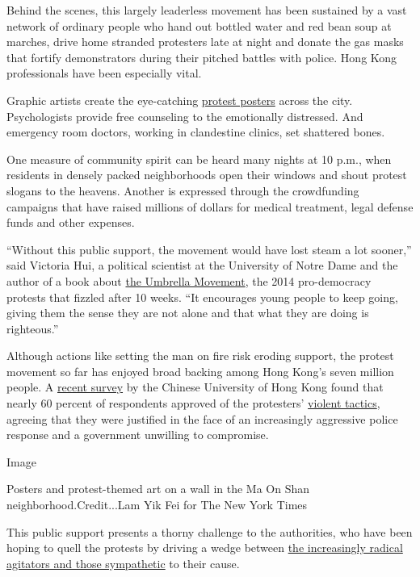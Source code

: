 Behind the scenes, this largely leaderless movement has been sustained
by a vast network of ordinary people who hand out bottled water and red
bean soup at marches, drive home stranded protesters late at night and
donate the gas masks that fortify demonstrators during their pitched
battles with police. Hong Kong professionals have been especially vital.

Graphic artists create the eye-catching
\href{https://www.nytimes.com/2019/10/11/world/asia/hong-kong-protest-art.html}{protest
posters} across the city. Psychologists provide free counseling to the
emotionally distressed. And emergency room doctors, working in
clandestine clinics, set shattered bones.

One measure of community spirit can be heard many nights at 10 p.m.,
when residents in densely packed neighborhoods open their windows and
shout protest slogans to the heavens. Another is expressed through the
crowdfunding campaigns that have raised millions of dollars for medical
treatment, legal defense funds and other expenses.

``Without this public support, the movement would have lost steam a lot
sooner,'' said Victoria Hui, a political scientist at the University of
Notre Dame and the author of a book about
\href{https://www.nytimes.com/2019/04/23/world/asia/hong-kong-umbrella-movement.html}{the
Umbrella Movement}, the 2014 pro-democracy protests that fizzled after
10 weeks. ``It encourages young people to keep going, giving them the
sense they are not alone and that what they are doing is righteous.''

Although actions like setting the man on fire risk eroding support, the
protest movement so far has enjoyed broad backing among Hong Kong's
seven million people. A
\href{https://www.independent.co.uk/voices/hong-kong-protests-police-violence-public-opinion-polling-support-a9158061.html}{recent
survey} by the Chinese University of Hong Kong found that nearly 60
percent of respondents approved of the protesters'
\href{https://www.nytimes.com/2019/10/27/world/asia/hong-kong-protests.html}{violent
tactics}, agreeing that they were justified in the face of an
increasingly aggressive police response and a government unwilling to
compromise.

Image

Posters and protest-themed art on a wall in the Ma On Shan
neighborhood.Credit...Lam Yik Fei for The New York Times

This public support presents a thorny challenge to the authorities, who
have been hoping to quell the protests by driving a wedge between
\href{https://www.nytimes.com/2019/09/27/world/asia/hong-kong-protests-identity.html}{the
increasingly radical agitators and those sympathetic} to their cause.

